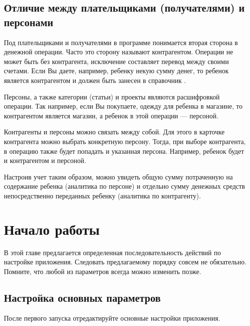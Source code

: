 \documentclass[a4paper,10pt,russian]{sphinxmanual}
\begin{document}
\section{Отличие между плательщиками (получателями) и персонами}
\label{\detokenize{intro:id4}}
Под плательщиками и получателями в программе понимается вторая сторона в денежной операции. Часто это сторону называют
контрагентом. Операции не может быть без контрагента, исключение составляет перевод между своими счетами. Если Вы даете, например,
ребенку некую сумму денег, то ребенок является контрагентом и должен быть занесен в справочник .

Персоны, а также категории (статьи) и проекты являются расшифровкой операции. Так например, если Вы покупаете, одежду для
ребенка в магазине, то контрагентом является магазин, а ребенок в этой операции — персоной.

Контрагенты и персоны можно связать между собой. Для этого в карточке контрагента можно выбрать конкретную персону. Тогда,
при выборе контрагента, в операцию также будет попадать и указанная персона. Например, ребенок будет и контрагентом и персоной.

Настроив учет таким образом, можно увидеть общую сумму потраченную на содержание ребенка (аналитика по персоне)
и отдельно сумму денежных средств непосредственно переданных ребенку (аналитика по контрагенту).


\chapter{Начало работы}
\label{\detokenize{getting-started:id1}}\label{\detokenize{getting-started::doc}}
В этой главе предлагается определенная последовательность действий по настройке приложения. Следовать предлагаемому порядку совсем не обязательно. Помните, что любой из параметров всегда можно изменить позже.


\section{Настройка основных параметров}
\label{\detokenize{getting-started:id2}}
После первого запуска отредактируйте основные настройки приложения.

\noindent{}

\noindent{}
\end{document}

